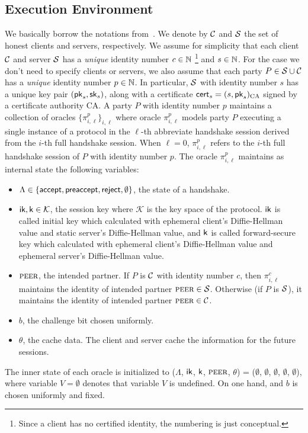 \subsection{Execution Environment} \label{sec:exec_env_party}
We basically borrow the notations
from~\cite{JKSS12:ACCE,KPW13:SACCE}.
We denote by $\mathcal{C}$ and $\mathcal{S}$ the set of honest
clients and servers, respectively.
We assume for simplicity that each client $\mathcal{C}$
and server $\mathcal{S}$ has a \textit{unique} identity
number $c \in \mathbb{N}$
\footnote{Since a client has no certified identity,
the numbering is just conceptual.}
and $s \in \mathbb{N}$.
For the case we don't need to specify clients or
servers, we also assume that each party
$P \in \mathcal{S} \cup \mathcal{C}$ has a \textit{unique}
identity number $p \in \mathbb{N}$.
In particular, $\mathcal{S}$ with identity number $s$ has a unique key pair
$(\mathsf{pk}_s, \mathsf{sk}_s)$, along with a certificate
$\mathsf{cert}_s=(s,\mathsf{pk}_s)_{\text{CA}}$ signed by a certificate
authority CA.
A party $P$ with identity number $p$ maintains a collection of oracles
$\{\pi^p_{i,\ell }\}_{i,\ell}$ where oracle
$\pi^p_{i, \ell}$ models party $P$ executing a single
instance of a protocol in the $\ell$-th abbreviate
handshake session derived from the $i$-th full
handshake session.
When $\ell=0$, $\pi^p_{i,\ell}$ refers to the $i$-th
full handshake session of $P$ with identity number $p$.
The oracle $\pi^p_{i, \ell}$ maintains as internal
state the following variables:

\begin{itemize}
 \item{$\Lambda \in \{\mathsf{accept}, \mathsf{preaccept}, \mathsf{reject},
 \emptyset\}$, the state of a handshake.}

 \item{$\mathsf{ik}, \mathsf{k} \in \mathcal{K}$, the session key
 where $\mathcal{K}$ is the key space of the protocol.
 $\mathsf{ik}$ is called initial key which calculated with
 ephemeral client's Diffie-Hellman value and static
 server's Diffie-Hellman value, and $\mathsf{k}$ is called
 forward-secure key which calculated with ephemeral
 client's Diffie-Hellman value and ephemeral server's
 Diffie-Hellman value.}

 \item{$\textsc{peer}$, the intended partner. If $P$ is
 $\mathcal{C}$ with identity number $c$, then $\pi^c_{i,\ell}$ maintains the
 identity of intended partner $\textsc{peer} \in \mathcal{S}$.
 Otherwise (if $P$ is $\mathcal{S}$), it maintains
 the identity of intended partner $\textsc{peer} \in \mathcal{C}$.}

 \item{$b$, the challenge bit chosen uniformly.}

 \item{$\theta$, the cache data. The client and server
 cache the information for the future sessions.}
\end{itemize}
The inner state of each oracle is initialized to
($\Lambda$, $\mathsf{ik}$, $\mathsf{k}$, $\textsc{peer}$, $\theta$) = ($\emptyset$,
$\emptyset$, $\emptyset$, $\emptyset$, $\emptyset$), where
variable $V=\emptyset$ denotes that variable $V$
is undefined.
On one hand, and $b$ is chosen uniformly and fixed.

